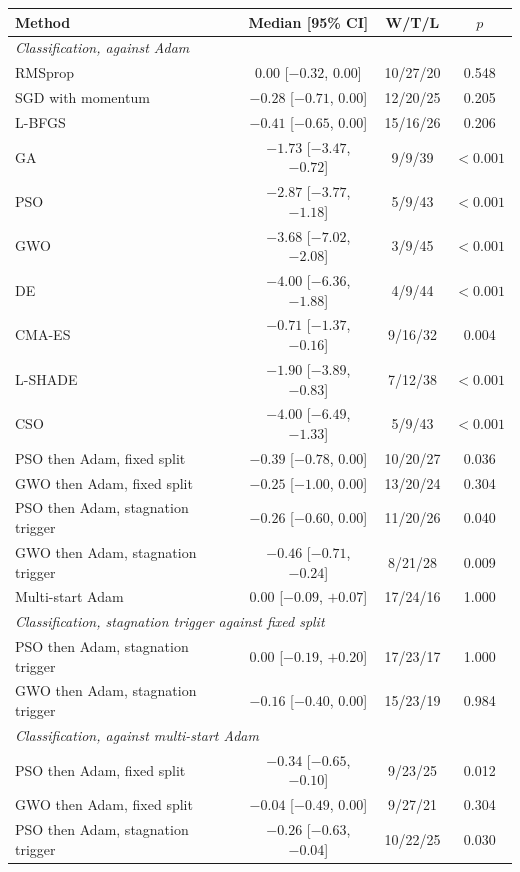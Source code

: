 \begin{tabular}{lccc}
\toprule
Method & Median [95\% CI] & W/T/L & $p$ \\
\midrule
\multicolumn{4}{l}{\emph{Classification, against Adam}} \\
RMSprop & $0.00$ [$-0.32$, $0.00$] & 10/27/20 & 0.548 \\
SGD with momentum & $-0.28$ [$-0.71$, $0.00$] & 12/20/25 & 0.205 \\
L-BFGS & $-0.41$ [$-0.65$, $0.00$] & 15/16/26 & 0.206 \\
GA & $-1.73$ [$-3.47$, $-0.72$] & 9/9/39 & $<0.001$ \\
PSO & $-2.87$ [$-3.77$, $-1.18$] & 5/9/43 & $<0.001$ \\
GWO & $-3.68$ [$-7.02$, $-2.08$] & 3/9/45 & $<0.001$ \\
DE & $-4.00$ [$-6.36$, $-1.88$] & 4/9/44 & $<0.001$ \\
CMA-ES & $-0.71$ [$-1.37$, $-0.16$] & 9/16/32 & 0.004 \\
L-SHADE & $-1.90$ [$-3.89$, $-0.83$] & 7/12/38 & $<0.001$ \\
CSO & $-4.00$ [$-6.49$, $-1.33$] & 5/9/43 & $<0.001$ \\
PSO then Adam, fixed split & $-0.39$ [$-0.78$, $0.00$] & 10/20/27 & 0.036 \\
GWO then Adam, fixed split & $-0.25$ [$-1.00$, $0.00$] & 13/20/24 & 0.304 \\
PSO then Adam, stagnation trigger & $-0.26$ [$-0.60$, $0.00$] & 11/20/26 & 0.040 \\
GWO then Adam, stagnation trigger & $-0.46$ [$-0.71$, $-0.24$] & 8/21/28 & 0.009 \\
Multi-start Adam & $0.00$ [$-0.09$, $+0.07$] & 17/24/16 & 1.000 \\
\midrule
\multicolumn{4}{l}{\emph{Classification, stagnation trigger against fixed split}} \\
PSO then Adam, stagnation trigger & $0.00$ [$-0.19$, $+0.20$] & 17/23/17 & 1.000 \\
GWO then Adam, stagnation trigger & $-0.16$ [$-0.40$, $0.00$] & 15/23/19 & 0.984 \\
\midrule
\multicolumn{4}{l}{\emph{Classification, against multi-start Adam}} \\
PSO then Adam, fixed split & $-0.34$ [$-0.65$, $-0.10$] & 9/23/25 & 0.012 \\
GWO then Adam, fixed split & $-0.04$ [$-0.49$, $0.00$] & 9/27/21 & 0.304 \\
PSO then Adam, stagnation trigger & $-0.26$ [$-0.63$, $-0.04$] & 10/22/25 & 0.030 \\

\end{tabular}
